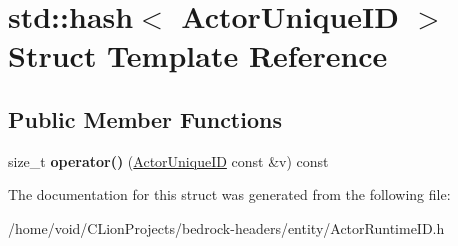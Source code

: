 \hypertarget{structstd_1_1hash_3_01_actor_unique_i_d_01_4}{}\section{std\+::hash$<$ Actor\+Unique\+ID $>$ Struct Template Reference}
\label{structstd_1_1hash_3_01_actor_unique_i_d_01_4}
\subsection*{Public Member Functions}
\begin{DoxyCompactItemize}
\item 
\mbox{\label{structstd_1_1hash_3_01_actor_unique_i_d_01_4_aff8511c01ec6935c2d5ab7551a3fab40}} 
size\+\_\+t {\bfseries operator()} (\mbox{\hyperlink{struct_actor_unique_i_d}{Actor\+Unique\+ID}} const \&v) const
\end{DoxyCompactItemize}


The documentation for this struct was generated from the following file\+:\begin{DoxyCompactItemize}
\item 
/home/void/\+C\+Lion\+Projects/bedrock-\/headers/entity/Actor\+Runtime\+I\+D.\+h\end{DoxyCompactItemize}
